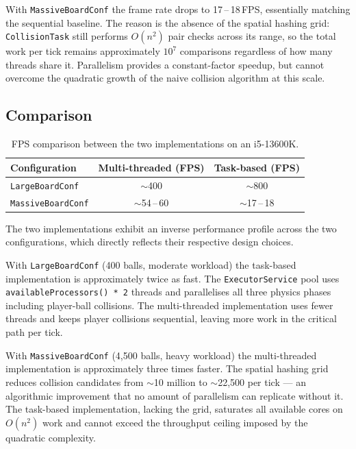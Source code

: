\documentclass[12pt,a4paper]{article}
\begin{document}
With \texttt{MassiveBoardConf} the frame rate drops to 17\,--\,18\,FPS,
essentially matching the sequential baseline. The reason is the absence
of the spatial hashing grid: \texttt{CollisionTask} still performs
$O(n^2)$ pair checks across its range, so the total work per tick remains
approximately $10^7$ comparisons regardless of how many threads share it.
Parallelism provides a constant-factor speedup, but cannot overcome the
quadratic growth of the naive collision algorithm at this scale.

\subsection{Comparison}

\begin{table}[H]
\centering
\begin{tabular}{lcc}
\hline
\textbf{Configuration} & \textbf{Multi-threaded (FPS)} & \textbf{Task-based (FPS)} \\
\hline
\texttt{LargeBoardConf}   & $\sim$400       & $\sim$800        \\
\texttt{MassiveBoardConf} & $\sim$54\,--\,60 & $\sim$17\,--\,18 \\
\hline
\end{tabular}
\caption{FPS comparison between the two implementations on an i5-13600K.}
\label{tab:comparison}
\end{table}
 
The two implementations exhibit an inverse performance profile across
the two configurations, which directly reflects their respective design
choices.
 
With \texttt{LargeBoardConf} (400 balls, moderate workload) the
task-based implementation is approximately twice as fast. The
\texttt{ExecutorService} pool uses \texttt{availableProcessors() * 2}
threads and parallelises all three physics phases including player-ball
collisions. The multi-threaded implementation uses fewer threads and
keeps player collisions sequential, leaving more work in the critical
path per tick.
 
With \texttt{MassiveBoardConf} (4{,}500 balls, heavy workload) the
multi-threaded implementation is approximately three times faster.
The spatial hashing grid reduces collision candidates from $\sim$10
million to $\sim$22{,}500 per tick — an algorithmic improvement that
no amount of parallelism can replicate without it. The task-based
implementation, lacking the grid, saturates all available cores on
$O(n^2)$ work and cannot exceed the throughput ceiling imposed by the
quadratic complexity.
 
\end{document}
